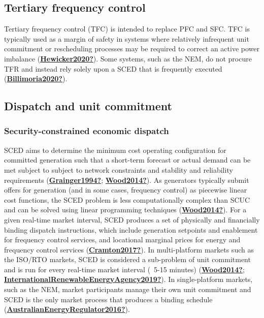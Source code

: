 \documentclass[12pt,a4paper,]{report}
\begin{document}
\hypertarget{tertiary-frequency-control}{%
\subsection{Tertiary frequency
control}\label{tertiary-frequency-control}}

Tertiary frequency control (TFC) is intended to replace PFC and SFC. TFC
is typically used as a margin of safety in systems where relatively
infrequent unit commitment or rescheduling processes may be required to
correct an active power imbalance
(\protect\hyperlink{ref-Hewicker2020}{\textbf{Hewicker2020?}}). Some
systems, such as the NEM, do not procure TFR and instead rely solely
upon a SCED that is frequently executed
(\protect\hyperlink{ref-Billimoria2020}{\textbf{Billimoria2020?}}).

\hypertarget{dispatch-and-unit-commitment}{%
\subsection{Dispatch and unit
commitment}\label{dispatch-and-unit-commitment}}

\hypertarget{security-constrained-economic-dispatch}{%
\subsubsection{Security-constrained economic
dispatch}\label{security-constrained-economic-dispatch}}

SCED aims to determine the minimum cost operating configuration for
committed generation such that a short-term forecast or actual demand
can be met subject to subject to network constraints and stability and
reliability requirements
(\protect\hyperlink{ref-Grainger1994}{\textbf{Grainger1994?}};
\protect\hyperlink{ref-Wood2014}{\textbf{Wood2014?}}). As generators
typically submit offers for generation (and in some cases, frequency
control) as piecewise linear cost functions, the SCED problem is less
computationally complex than SCUC and can be solved using linear
programming techniques
(\protect\hyperlink{ref-Wood2014}{\textbf{Wood2014?}}). For a given
real-time market interval, SCED produces a set of physically and
financially binding dispatch instructions, which include generation
setpoints and enablement for frequency control services, and locational
marginal prices for energy and frequency control services
(\protect\hyperlink{ref-Cramton2017}{\textbf{Cramton2017?}}). In
multi-platform markets such as the ISO/RTO markets, SCED is considered a
sub-problem of unit commitment and is run for every real-time market
interval (~5-15 minutes)
(\protect\hyperlink{ref-Wood2014}{\textbf{Wood2014?}};
\protect\hyperlink{ref-InternationalRenewableEnergyAgency2019}{\textbf{InternationalRenewableEnergyAgency2019?}}).
In single-platform markets, such as the NEM, market participants manage
their own unit commitment and SCED is the only market process that
produces a binding schedule
(\protect\hyperlink{ref-AustralianEnergyRegulator2016}{\textbf{AustralianEnergyRegulator2016?}}).
\end{document}
